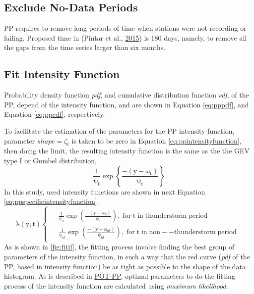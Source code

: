 \documentclass[12pt,oneside]{reedthesis}
\begin{document}
\hypertarget{exclude-no-data-periods}{%
\subsection{Exclude No-Data Periods}\label{exclude-no-data-periods}}

PP requires to remove long periods of time when stations were not recording or failing. Proposed time in (Pintar et al., \protect\hyperlink{ref-Pintar2015}{2015}) is 180 days, namely, to remove all the gaps from the time series larger than six months.

\hypertarget{fit-intensity-function}{%
\subsection{Fit Intensity Function}\label{fit-intensity-function}}

Probability density function \emph{pdf}, and cumulative distribution function \emph{cdf}, of the PP, depend of the intensity function, and are shown in Equation \eqref{eq:pppdf}, and Equation \eqref{eq:ppcdf}, respectively.

To facilitate the estimation of the parameters for the PP intensity function, parameter \(shape = \zeta_t\) is taken to be zero in Equation \eqref{eq:ppintensityfunction}, then doing the limit, the resulting intensity function is the same as the the GEV type I or Gumbel distribution,
\begin{equation}
  \mathrm{
          \frac{1}{\psi_t}\exp\left\{\frac{-(y-\omega_t)}{\psi_t}\right\}
         }
  \label{eq:ppusedif}
\end{equation}
In this study, used intensity functions are shown in next Equation \eqref{eq:ppspecificintensityfunction}.
\begin{equation}
  \mathrm{
    \lambda\left(y,t\right)
    \begin{cases}
      \begin{split}
            &\frac{1}{\psi_s}\exp\left(\frac{-(y-\omega_s)}{\psi_s}\right),\;for\;t\;in\;thunderstorm\;period
            \\
            &\frac{1}{\psi_{nt}}\exp\left(\frac{-(y-\omega_{nt})}{\psi_{nt}}\right),\;for\;t\;in\;non--thunderstorm\;period      
      \end{split}
    \end{cases}
  }
  \label{eq:ppspecificintensityfunction}
\end{equation}
As is shown in \ref{fig:fitif}, the fitting process involve finding the best group of parameters of the intensity function, in such a way that the red curve (\emph{pdf} of the PP, based in intensity function) be as tight as possible to the shape of the data histogram. As is described in \protect\hyperlink{pot-pp}{POT-PP}, optimal parameters to do the fitting process of the intensity function are calculated using \emph{maximum likelihood}.
\end{document}
